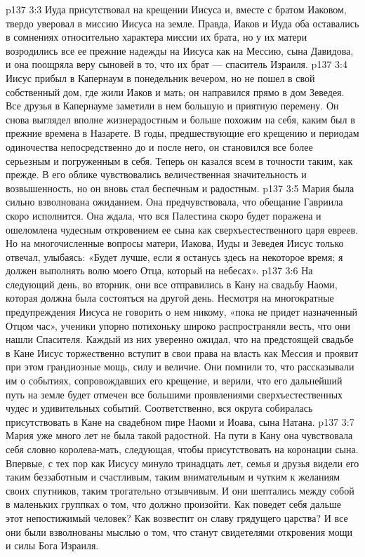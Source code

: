 \vs p137 3:3 Иуда присутствовал на крещении Иисуса и, вместе с братом Иаковом, твердо уверовал в миссию Иисуса на земле. Правда, Иаков и Иуда оба оставались в сомнениях относительно характера миссии их брата, но у их матери возродились все ее прежние надежды на Иисуса как на Мессию, сына Давидова, и она поощряла веру сыновей в то, что их брат --- спаситель Израиля.
\vs p137 3:4 \pc Иисус прибыл в Капернаум в понедельник вечером, но не пошел в свой собственный дом, где жили Иаков и мать; он направился прямо в дом Зеведея. Все друзья в Капернауме заметили в нем большую и приятную перемену. Он снова выглядел вполне жизнерадостным и больше похожим на себя, каким был в прежние времена в Назарете. В годы, предшествующие его крещению и периодам одиночества непосредственно до и после него, он становился все более серьезным и погруженным в себя. Теперь он казался всем в точности таким, как прежде. В его облике чувствовались величественная значительность и возвышенность, но он вновь стал беспечным и радостным.
\vs p137 3:5 Мария была сильно взволнована ожиданием. Она предчувствовала, что обещание Гавриила скоро исполнится. Она ждала, что вся Палестина скоро будет поражена и ошеломлена чудесным откровением ее сына как сверхъестественного царя евреев. Но на многочисленные вопросы матери, Иакова, Иуды и Зеведея Иисус только отвечал, улыбаясь: «Будет лучше, если я останусь здесь на некоторое время; я должен выполнять волю моего Отца, который на небесах».
\vs p137 3:6 \pc На следующий день, во вторник, они все отправились в Кану на свадьбу Наоми, которая должна была состояться на другой день. Несмотря на многократные предупреждения Иисуса не говорить о нем никому, «пока не придет назначенный Отцом час», ученики упорно потихоньку широко распространяли весть, что они нашли Спасителя. Каждый из них уверенно ожидал, что на предстоящей свадьбе в Кане Иисус торжественно вступит в свои права на власть как Мессия и проявит при этом грандиозные мощь, силу и величие. Они помнили то, что рассказывали им о событиях, сопровождавших его крещение, и верили, что его дальнейший путь на земле будет отмечен все большими проявлениями сверхъестественных чудес и удивительных событий. Соответственно, вся округа собиралась присутствовать в Кане на свадебном пире Наоми и Иоава, сына Натана.
\vs p137 3:7 Мария уже много лет не была такой радостной. На пути в Кану она чувствовала себя словно королева\hyp{}мать, следующая, чтобы присутствовать на коронации сына. Впервые, с тех пор как Иисусу минуло тринадцать лет, семья и друзья видели его таким беззаботным и счастливым, таким внимательным и чутким к желаниям своих спутников, таким трогательно отзывчивым. И они шептались между собой в маленьких группках о том, что должно произойти. Как поведет себя дальше этот непостижимый человек? Как возвестит он славу грядущего царства? И все они были взволнованы мыслью о том, что станут свидетелями откровения мощи и силы Бога Израиля.

